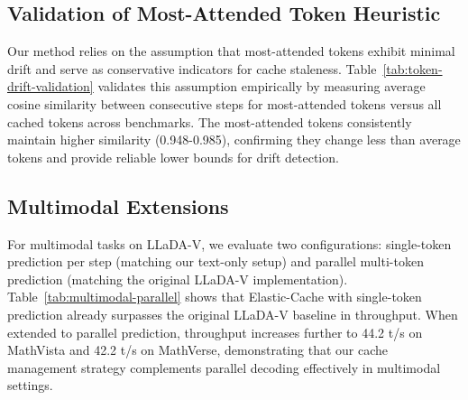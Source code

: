 \documentclass{article} %
\theoremstyle{definition}
\theoremstyle{remark}
\begin{document}
\subsection{Validation of Most-Attended Token Heuristic}

Our method relies on the assumption that most-attended tokens exhibit minimal drift and serve as conservative indicators for cache staleness. Table~\ref{tab:token-drift-validation} validates this assumption empirically by measuring average cosine similarity between consecutive steps for most-attended tokens versus all cached tokens across benchmarks. The most-attended tokens consistently maintain higher similarity (0.948-0.985), confirming they change less than average tokens and provide reliable lower bounds for drift detection.

\begin{table}[!htbp]
\centering
\caption{Empirical validation of most-attended token stability. Higher cosine similarity indicates lower drift. Results on LLaDA-1.5 with $\gamma=0.9$.}
\label{tab:token-drift-validation}
\vspace{-0.1in}
\end{table}

\subsection{Multimodal Extensions}

For multimodal tasks on LLaDA-V, we evaluate two configurations: single-token prediction per step (matching our text-only setup) and parallel multi-token prediction (matching the original LLaDA-V implementation). Table~\ref{tab:multimodal-parallel} shows that Elastic-Cache with single-token prediction already surpasses the original LLaDA-V baseline in throughput. When extended to parallel prediction, throughput increases further to 44.2 t/s on MathVista and 42.2 t/s on MathVerse, demonstrating that our cache management strategy complements parallel decoding effectively in multimodal settings.
\end{document}

